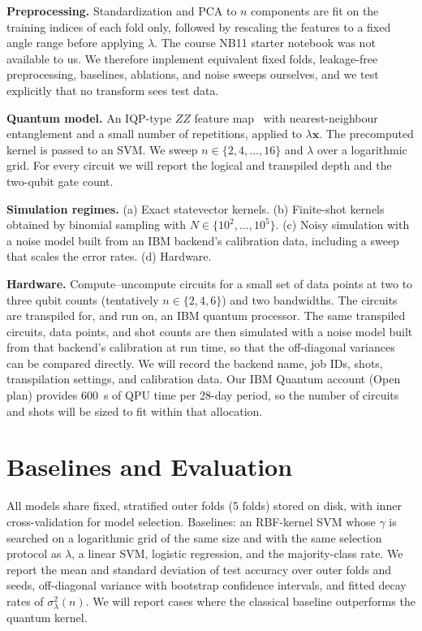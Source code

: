 \documentclass[conference]{IEEEtran}
\begin{document}
\textbf{Preprocessing.} Standardization and PCA to $n$ components are fit on the training indices of each fold only, followed by rescaling the features to a fixed angle range before applying $\lambda$. The course NB11 starter notebook was not available to us. We therefore implement equivalent fixed folds, leakage-free preprocessing, baselines, ablations, and noise sweeps ourselves, and we test explicitly that no transform sees test data.

\textbf{Quantum model.} An IQP-type $ZZ$ feature map~\cite{havlicek2019supervised} with nearest-neighbour entanglement and a small number of repetitions, applied to $\lambda\mathbf{x}$. The precomputed kernel is passed to an SVM. We sweep $n\in\{2,4,\dots,16\}$ and $\lambda$ over a logarithmic grid. For every circuit we will report the logical and transpiled depth and the two-qubit gate count.

\textbf{Simulation regimes.} (a) Exact statevector kernels. (b) Finite-shot kernels obtained by binomial sampling with $N\in\{10^{2},\dots,10^{5}\}$. (c) Noisy simulation with a noise model built from an IBM backend's calibration data, including a sweep that scales the error rates. (d) Hardware.

\textbf{Hardware.} Compute--uncompute circuits for a small set of data points at two to three qubit counts (tentatively $n\in\{2,4,6\}$) and two bandwidths. The circuits are transpiled for, and run on, an IBM quantum processor. The same transpiled circuits, data points, and shot counts are then simulated with a noise model built from that backend's calibration at run time, so that the off-diagonal variances can be compared directly. We will record the backend name, job IDs, shots, transpilation settings, and calibration data. Our IBM Quantum account (Open plan) provides 600~s of QPU time per 28-day period, so the number of circuits and shots will be sized to fit within that allocation.

\section{Baselines and Evaluation}
All models share fixed, stratified outer folds (5 folds) stored on disk, with inner cross-validation for model selection. Baselines: an RBF-kernel SVM whose $\gamma$ is searched on a logarithmic grid of the same size and with the same selection protocol as $\lambda$, a linear SVM, logistic regression, and the majority-class rate. We report the mean and standard deviation of test accuracy over outer folds and seeds, off-diagonal variance with bootstrap confidence intervals, and fitted decay rates of $\sigma^{2}_{\lambda}(n)$. We will report cases where the classical baseline outperforms the quantum kernel.
\end{document}
